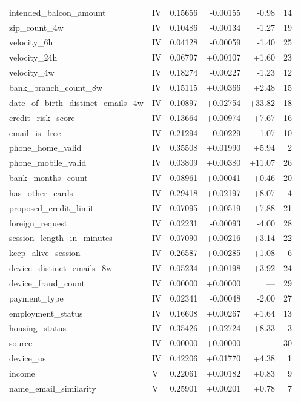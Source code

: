 \begin{longtable}{@{}llrrrr@{}}
intended\_balcon\_amount & IV & 0.15656 & -0.00155 & -0.98 & 14 \\
zip\_count\_4w & IV & 0.10486 & -0.00134 & -1.27 & 19 \\
velocity\_6h & IV & 0.04128 & -0.00059 & -1.40 & 25 \\
velocity\_24h & IV & 0.06797 & +0.00107 & +1.60 & 23 \\
velocity\_4w & IV & 0.18274 & -0.00227 & -1.23 & 12 \\
bank\_branch\_count\_8w & IV & 0.15115 & +0.00366 & +2.48 & 15 \\
date\_of\_birth\_distinct\_emails\_4w & IV & 0.10897 & +0.02754 & +33.82 & 18 \\
credit\_risk\_score & IV & 0.13664 & +0.00974 & +7.67 & 16 \\
email\_is\_free & IV & 0.21294 & -0.00229 & -1.07 & 10 \\
phone\_home\_valid & IV & 0.35508 & +0.01990 & +5.94 & 2 \\
phone\_mobile\_valid & IV & 0.03809 & +0.00380 & +11.07 & 26 \\
bank\_months\_count & IV & 0.08961 & +0.00041 & +0.46 & 20 \\
has\_other\_cards & IV & 0.29418 & +0.02197 & +8.07 & 4 \\
proposed\_credit\_limit & IV & 0.07095 & +0.00519 & +7.88 & 21 \\
foreign\_request & IV & 0.02231 & -0.00093 & -4.00 & 28 \\
session\_length\_in\_minutes & IV & 0.07090 & +0.00216 & +3.14 & 22 \\
keep\_alive\_session & IV & 0.26587 & +0.00285 & +1.08 & 6 \\
device\_distinct\_emails\_8w & IV & 0.05234 & +0.00198 & +3.92 & 24 \\
device\_fraud\_count & IV & 0.00000 & +0.00000 & --- & 29 \\
payment\_type & IV & 0.02341 & -0.00048 & -2.00 & 27 \\
employment\_status & IV & 0.16608 & +0.00267 & +1.64 & 13 \\
housing\_status & IV & 0.35426 & +0.02724 & +8.33 & 3 \\
source & IV & 0.00000 & +0.00000 & --- & 30 \\
device\_os & IV & 0.42206 & +0.01770 & +4.38 & 1 \\
income & V & 0.22061 & +0.00182 & +0.83 & 9 \\
name\_email\_similarity & V & 0.25901 & +0.00201 & +0.78 & 7 \\

\end{longtable}
